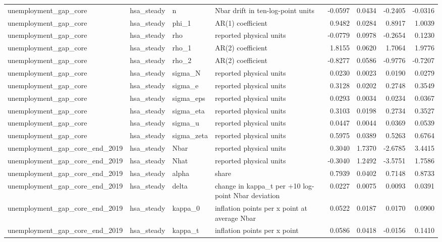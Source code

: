 \begin{tabular}{llllrrrr}
unemployment\_gap\_core & hsa\_steady & n & Nbar drift in ten-log-point units & -0.0597 & 0.0434 & -0.2405 & -0.0316 \\
unemployment\_gap\_core & hsa\_steady & phi\_1 & AR(1) coefficient & 0.9482 & 0.0284 & 0.8917 & 1.0039 \\
unemployment\_gap\_core & hsa\_steady & rho & reported physical units & -0.0779 & 0.0978 & -0.2654 & 0.1230 \\
unemployment\_gap\_core & hsa\_steady & rho\_1 & AR(2) coefficient & 1.8155 & 0.0620 & 1.7064 & 1.9776 \\
unemployment\_gap\_core & hsa\_steady & rho\_2 & AR(2) coefficient & -0.8277 & 0.0586 & -0.9776 & -0.7207 \\
unemployment\_gap\_core & hsa\_steady & sigma\_N & reported physical units & 0.0230 & 0.0023 & 0.0190 & 0.0279 \\
unemployment\_gap\_core & hsa\_steady & sigma\_e & reported physical units & 0.3128 & 0.0202 & 0.2748 & 0.3549 \\
unemployment\_gap\_core & hsa\_steady & sigma\_eps & reported physical units & 0.0293 & 0.0034 & 0.0234 & 0.0367 \\
unemployment\_gap\_core & hsa\_steady & sigma\_eta & reported physical units & 0.3103 & 0.0198 & 0.2734 & 0.3527 \\
unemployment\_gap\_core & hsa\_steady & sigma\_u & reported physical units & 0.0447 & 0.0044 & 0.0369 & 0.0539 \\
unemployment\_gap\_core & hsa\_steady & sigma\_zeta & reported physical units & 0.5975 & 0.0389 & 0.5263 & 0.6764 \\
unemployment\_gap\_core\_end\_2019 & hsa\_steady & Nbar & reported physical units & 0.3040 & 1.7370 & -2.6785 & 3.4415 \\
unemployment\_gap\_core\_end\_2019 & hsa\_steady & Nhat & reported physical units & -0.3040 & 1.2492 & -3.5751 & 1.7586 \\
unemployment\_gap\_core\_end\_2019 & hsa\_steady & alpha & share & 0.7939 & 0.0402 & 0.7148 & 0.8733 \\
unemployment\_gap\_core\_end\_2019 & hsa\_steady & delta & change in kappa\_t per +10 log-point Nbar deviation & 0.0227 & 0.0075 & 0.0093 & 0.0391 \\
unemployment\_gap\_core\_end\_2019 & hsa\_steady & kappa\_0 & inflation points per x point at average Nbar & 0.0522 & 0.0187 & 0.0170 & 0.0900 \\
unemployment\_gap\_core\_end\_2019 & hsa\_steady & kappa\_t & inflation points per x point & 0.0586 & 0.0418 & -0.0156 & 0.1410 \\

\end{tabular}
